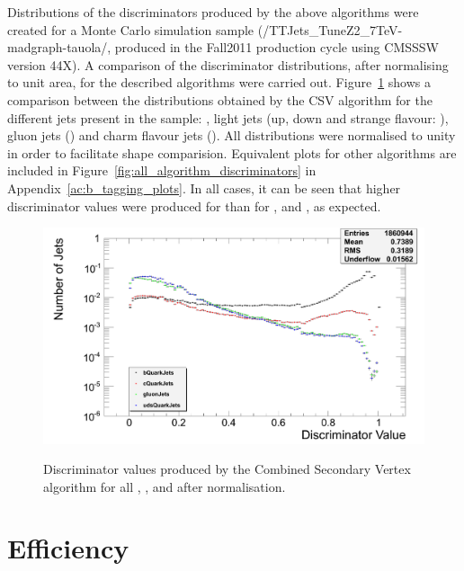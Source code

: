 Distributions of the discriminators produced by the above algorithms were created for a \ttbar \MADGRAPH Monte
Carlo simulation sample (/TTJets\_TuneZ2\_7TeV-madgraph-tauola/, produced in the Fall2011 production cycle
using CMSSSW version 44X). A comparison of the discriminator distributions, after normalising to unit area,
for the described algorithms were carried out. Figure~\ref{fig:CSV_discriminators} shows a comparison between
the distributions obtained by the CSV algorithm for the different jets present in the sample: \bjets, light
jets (up, down and strange flavour: \udsjets), gluon jets (\gjets) and charm flavour jets (\cjets). All
distributions were normalised to unity in order to facilitate shape comparision. Equivalent plots for other
algorithms are included in Figure~\ref{fig:all_algorithm_discriminators} in Appendix~\ref{ac:b_tagging_plots}.
In all cases, it can be seen that higher discriminator values were produced for \bjets than for \udsjets,
\gjets and \cjets, as expected.

\begin{figure}[hbtp]
   \centering
     \includegraphics[width=\textwidth]{Chapters/04_Analysis/04a_BTags/Images/CombinedSecondaryVertex_norm_discriminator_combined}\\
     \caption[Discriminator values produced by the Combined Secondary Vertex algorithm after
     normalisation.]{Discriminator values produced by the Combined Secondary Vertex algorithm for all \bjets,
     \cjets, \gjets and \udsjets after normalisation.}
     \label{fig:CSV_discriminators}
\end{figure}

\section{Efficiency}
\label{s:efficiency}

